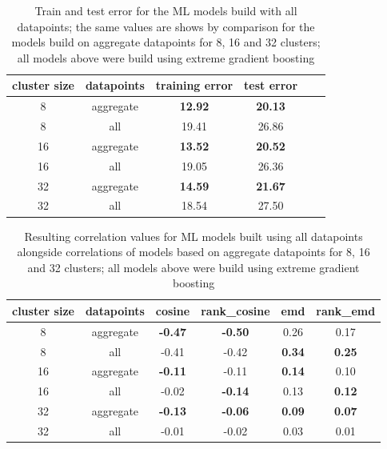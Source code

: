 {\begin{table}[!ht]
	{\color{green}
	\centering
	\small
	\begin{tabular}{ | c | c | c | c | c | c | }
		\hline
		{cluster size} & datapoints & {training error} & {test error} \\ \hline
		8	&	aggregate &	\textbf{12.92}	& \textbf{20.13} \\ \hline
		8	&	all		&	19.41	&	26.86 \\ \hline \hline
		16	&	aggregate	&	\textbf{13.52}	&	\textbf{20.52} \\ \hline
		16	&	all		&	19.05	&	26.36 \\ \hline \hline
		32	&	aggregate	&	\textbf{14.59}	&	\textbf{21.67} \\ \hline
		32	&	all		&	18.54	&	27.50 \\ \hline
	\end{tabular}%
	\caption{\color{green} Train and test error for the ML models build with all datapoints; the same values are shows by comparison for the models build on aggregate datapoints for 8, 16 and 32 clusters; all models above were build using extreme gradient boosting}
	\label{extensions:train_test_errors}}
\end{table}


\begin{table}[!ht]
	{\color{green}
	\centering
	\small
	\begin{tabular}{ | c | c | c | c | c | c | }
		\hline
		{cluster size} & datapoints & cosine & rank\_cosine & emd & rank\_emd \\ \hline
		8	&	aggregate	&	\textbf{-0.47}	&	\textbf{-0.50}	&	0.26	&	0.17 \\ \hline
		8	&	all		&	-0.41	&	-0.42	&	\textbf{0.34}	&	\textbf{0.25} \\ \hline \hline
		16	&	aggregate	&	\textbf{-0.11}	&	-0.11	&	\textbf{0.14}	&	0.10 \\ \hline
		16	&	all		&	-0.02	&	\textbf{-0.14}	&	0.13	&	\textbf{0.12} \\ \hline \hline
		32	&	aggregate	&	\textbf{-0.13}	&	\textbf{-0.06}	&	\textbf{0.09}	&	\textbf{0.07} \\ \hline
		32	&	all		&	-0.01	&	-0.02	&	0.03	&	0.01 \\ \hline
	\end{tabular}%
	\caption{\color{green} Resulting correlation values for ML models built using all datapoints alongside correlations of models based on aggregate datapoints for 8, 16 and 32 clusters; all models above were build using extreme gradient boosting}
	\label{extensions:correlation_values}}
\end{table}


}
